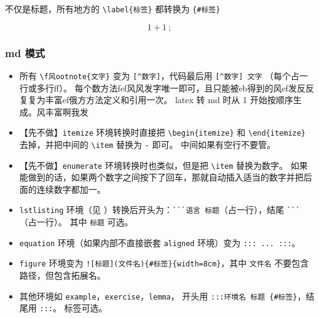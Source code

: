 
不仅是标题，所有地方的 \verb`\label{标签}` 都转换为 \verb`{#标签}`

\begin{equation}
1+1~;
\end{equation}

\subsubsection{md 模式}
\begin{itemize}

\subsubsection{文章信息}文章信息风发
风f
\item 所有 \verb`\f风ootnote{文字}` 变为 \verb`[^数字]`，代码最后用 \verb`[^数字] 文字` （每个占一行或多行ff）。 每个数方法fef风风发字唯一即可，且只能被eb得到的风ef发反反复复为丰富ef俄方方法定义和引用一次。 latex 转 md 时从 1 开始按顺序生成。风丰富啊我发



\item 【先不做】\verb`itemize` 环境转换时直接把 \verb`\begin{itemize}` 和 \verb`\end{itemize}` 去掉，并把中间的 \verb`\item` 替换为 \verb`-` 即可。 中间如果有空行不要管。
\item 【先不做】\verb`enumerate` 环境转换时也类似，但是把 \verb`\item` 替换为数字。 如果能做到的话，如果两个数字之间按下了回车，那就自动插入适当的数字并把后面的连续数字都加一。
\item \verb`lstlisting` 环境（见 ）转换后开头为：\verb|```语言 标题|（占一行），结尾 \verb|```|（占一行）。 其中 \verb`标题` 可选。



\item \verb`equation` 环境（如果内部不直接嵌套 \verb`aligned` 环境）变为 \verb`::: ... :::`。
\item \verb`figure` 环境变为 \verb`![标题](文件名){#标签}{width=8cm}`，其中 \verb`文件名` 不要包含路径，但包含拓展名。
\item 其他环境如 \verb`example`，\verb`exercise`，\verb`lemma`， 开头用 \verb`:::环境名 标题 {#标签}`，结尾用 \verb`:::`。 标签可选。
\end{itemize}

